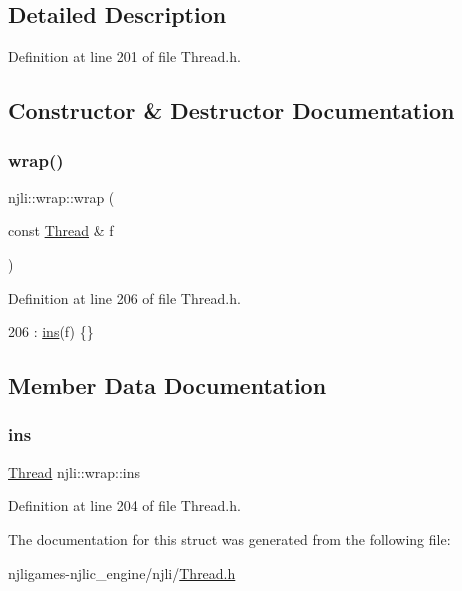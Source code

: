 \subsection{Detailed Description}


Definition at line 201 of file Thread.\+h.



\subsection{Constructor \& Destructor Documentation}
\mbox{\label{structnjli_1_1wrap_a2d6762e15815bb762e1da6ac8c4299c2}} 
\subsubsection{\texorpdfstring{wrap()}{wrap()}}
{\footnotesize\ttfamily njli\+::wrap\+::wrap (\begin{DoxyParamCaption}\item[{const \mbox{\hyperlink{classnjli_1_1_thread}{Thread}} \&}]{f }\end{DoxyParamCaption})\hspace{0.3cm}{\ttfamily [inline]}}



Definition at line 206 of file Thread.\+h.


\begin{DoxyCode}
206 : \mbox{\hyperlink{structnjli_1_1wrap_a642a7dd725d24a5c0a540c8d6158bbb7}{ins}}(f) \{\}
\end{DoxyCode}


\subsection{Member Data Documentation}
\mbox{\label{structnjli_1_1wrap_a642a7dd725d24a5c0a540c8d6158bbb7}} 
\subsubsection{\texorpdfstring{ins}{ins}}
{\footnotesize\ttfamily \mbox{\hyperlink{classnjli_1_1_thread}{Thread}} njli\+::wrap\+::ins}



Definition at line 204 of file Thread.\+h.



The documentation for this struct was generated from the following file\+:\begin{DoxyCompactItemize}
\item 
njligames-\/njlic\+\_\+engine/njli/\mbox{\hyperlink{_thread_8h}{Thread.\+h}}\end{DoxyCompactItemize}

